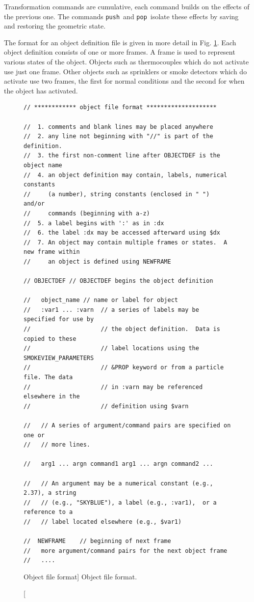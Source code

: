 \documentclass[11pt,twoside]{book}
\begin{document}
Transformation commands are cumulative, each command builds on the
effects of the previous one.  The commands {\tt push}\ and
{\tt pop}\ isolate these effects by saving and restoring the geometric state.

The format for an object definition file is given in more detail
in Fig. \ref{figobjectdef}.  Each object definition consists of
one or more frames.  A frame is used to represent various states
of the object. Objects such as thermocouples which do not activate
use just one frame. Other objects such as sprinklers or smoke
detectors which do activate use two frames, the first for normal
conditions and the second for when the object has activated.

\begin{figure}[bph]
{\small
\begin{lstlisting}[frame=single,rulecolor=\color{yellow},
framerule=1pt,framesep=1pc,fillcolor=\color{yellow}]
// ************ object file format ********************

//  1. comments and blank lines may be placed anywhere
//  2. any line not beginning with "//" is part of the definition.
//  3. the first non-comment line after OBJECTDEF is the object name
//  4. an object definition may contain, labels, numerical constants
//     (a number), string constants (enclosed in " ") and/or
//     commands (beginning with a-z)
//  5. a label begins with ':' as in :dx
//  6. the label :dx may be accessed afterward using $dx
//  7. An object may contain multiple frames or states.  A new frame within
//     an object is defined using NEWFRAME

// OBJECTDEF // OBJECTDEF begins the object definition

//   object_name // name or label for object
//   :var1 ... :varn  // a series of labels may be specified for use by
//                    // the object definition.  Data is copied to these
//                    // label locations using the SMOKEVIEW_PARAMETERS
//                    // &PROP keyword or from a particle file. The data
//                    // in :varn may be referenced  elsewhere in the
//                    // definition using $varn

//   // A series of argument/command pairs are specified on one or
//   // more lines.

//   arg1 ... argn command1 arg1 ... argn command2 ...

//   // An argument may be a numerical constant (e.g., 2.37), a string
//   // (e.g., "SKYBLUE"), a label (e.g., :var1),  or a reference to a
//   // label located elsewhere (e.g., $var1)

//  NEWFRAME    // beginning of next frame
//   more argument/command pairs for the next object frame
//   ....
\end{lstlisting}
}
\caption
[Object file format]
{Object file format.}
\label{figobjectdef}%
\end{figure}
\end{document}
